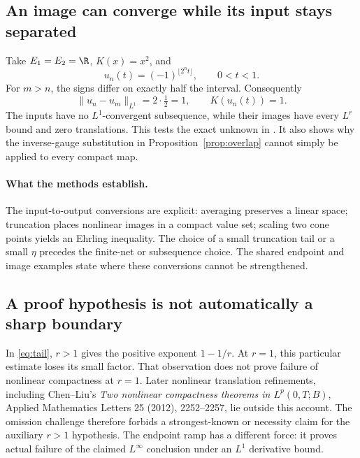 \documentclass[12pt,reqno]{amsart}
\begin{document}
\subsection{An image can converge while its input stays separated}
Take $E_1=E_2=\R$, $K(x)=x^2$, and
\[
u_n(t)=(-1)^{\lfloor 2^nt\rfloor},\qquad 0<t<1.
\]
For $m>n$, the signs differ on exactly half the interval. Consequently
\[
\|u_n-u_m\|_{L^1}=2\cdot\tfrac12=1,
\qquad K(u_n(t))=1.
\]
The inputs have no $L^1$-convergent subsequence, while their images have every $L^r$ bound and zero translations. This tests the exact unknown in \cite[Theorem 2.1 and Remark 2.2(3), p.~1726]{S-maitre}. It also shows why the inverse-gauge substitution in Proposition~\ref{prop:overlap} cannot simply be applied to every compact map.
\paragraph{What the methods establish.}
The input-to-output conversions are explicit: averaging preserves a linear space; truncation places nonlinear images in a compact value set; scaling two cone points yields an Ehrling inequality. The choice of a small truncation tail or a small $\eta$ precedes the finite-net or subsequence choice. The shared endpoint and image examples state where these conversions cannot be strengthened.
\subsection{A proof hypothesis is not automatically a sharp boundary}
In \eqref{eq:tail}, $r>1$ gives the positive exponent $1-1/r$. At $r=1$, this particular estimate loses its small factor. That observation does not prove failure of nonlinear compactness at $r=1$.
Later nonlinear translation refinements, including Chen--Liu's \emph{Two nonlinear compactness theorems in $L^p(0,T;B)$}, Applied Mathematics Letters 25 (2012), 2252--2257, lie outside this account. The omission challenge therefore forbids a strongest-known or necessity claim for the auxiliary $r>1$ hypothesis. The endpoint ramp has a different force: it proves actual failure of the claimed $L^\infty$ conclusion under an $L^1$ derivative bound.
\clearpage


\end{document}
